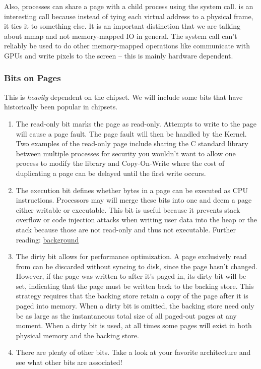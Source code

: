 Also, processes can share a page with a child process using the  system call.
 is an interesting call because instead of tying each virtual address to a physical frame, it ties it to something else. It is an important distinction that we are talking about mmap and not memory-mapped IO in general. The  system call can't reliably be used to do other memory-mapped operations like communicate with GPUs and write pixels to the screen -- this is mainly hardware dependent.

\subsubsection{Bits on Pages}

This is \textit{heavily} dependent on the chipset.
We will include some bits that have historically been popular in chipsets.

\begin{enumerate}
\item The read-only bit marks the page as read-only.
Attempts to write to the page will cause a page fault.
The page fault will then be handled by the Kernel.
Two examples of the read-only page include sharing the C standard library between multiple processes for security you wouldn't want to allow one process to modify the library and Copy-On-Write where the cost of duplicating a page can be delayed until the first write occurs.

\item The execution bit defines whether bytes in a page can be executed as CPU instructions.
Processors may will merge these bits into one and deem a page either writable or executable.
This bit is useful because it prevents stack overflow or code injection attacks when writing user data into the heap or the stack because those are not read-only and thus not executable.
Further reading: \href{http://en.wikipedia.org/wiki/NX\_bit\#Hardware\_background}{background}

\item The dirty bit allows for performance optimization.
A page exclusively read from can be discarded without syncing to disk, since the page hasn't changed.
However, if the page was written to after it's paged in, its dirty bit will be set, indicating that the page must be written back to the backing store.
This strategy requires that the backing store retain a copy of the page after it is paged into memory.
When a dirty bit is omitted, the backing store need only be as large as the instantaneous total size of all paged-out pages at any moment.
When a dirty bit is used, at all times some pages will exist in both physical memory and the backing store.
\item There are plenty of other bits. Take a look at your favorite architecture and see what other bits are associated!
\end{enumerate}

